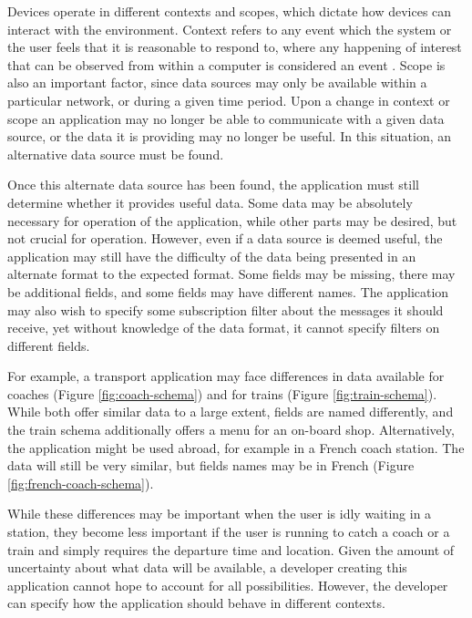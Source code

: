 \documentclass[12pt,twoside,notitlepage]{report}
\begin{document}
Devices operate in different contexts and scopes, which dictate how devices can interact with the environment. 
Context refers to any event which the system or the user feels that it is reasonable to respond to, where any happening of interest that can be observed from within a computer is considered an event \cite[page 11]{Muhl:2006:DES:1162246}.
Scope is also an important factor, since data sources may only be available within a particular network, or during a given time period. 
Upon a change in context or scope an application may no longer be able to communicate with a given data source, or the data it is providing may no longer be useful. 
In this situation, an alternative data source must be found.

Once this alternate data source has been found, the application must still determine whether it provides useful data. 
Some data may be absolutely necessary for operation of the application, while other parts may be desired, but not crucial for operation.  
However, even if a data source is deemed useful, the application may still have the difficulty of the data being presented in an alternate format to the expected format. 
Some fields may be missing, there may be additional fields, and some fields may have different names. 
The application may also wish to specify some subscription filter about the messages it should receive, yet without knowledge of the data format, it cannot specify filters on different fields.

For example, a transport application may face differences in data available for coaches (Figure \ref{fig:coach-schema}) and for trains (Figure \ref{fig:train-schema}). 
While both offer similar data to a large extent, fields are named differently, and the train schema additionally offers a menu for an on-board shop.
Alternatively, the application might be used abroad, for example in a French coach station. The data will still be very similar, but fields names may be in French (Figure \ref{fig:french-coach-schema}).

While these differences may be important when the user is idly waiting in a station, they become less important if the user is running to catch a coach or a train and simply requires the departure time and location.
Given the amount of uncertainty about what data will be available, a developer creating this application cannot hope to account for all possibilities. 
However, the developer can specify how the application should behave in different contexts.
\end{document}
